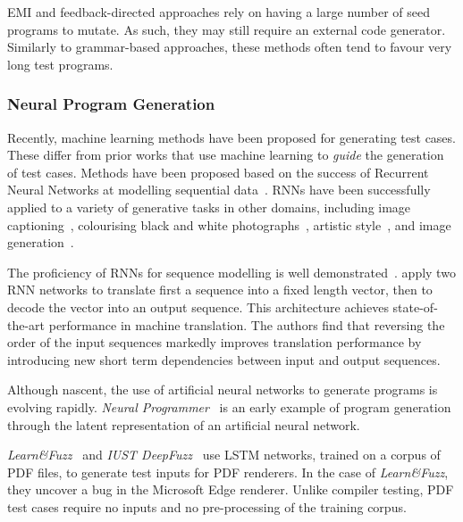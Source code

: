 EMI and feedback-directed approaches rely on having a large number of seed programs to mutate. As such, they may still require an external code generator. Similarly to grammar-based approaches, these methods often tend to favour very long test programs.


\subsubsection{Neural Program Generation}
\label{subsec:related-work-neural-program-generation}

Recently, machine learning methods have been proposed for generating test cases. These differ from prior works that use machine learning to \emph{guide} the generation of test cases.
Methods have been proposed based on the success of Recurrent Neural Networks at modelling sequential data~\cite{Jozefowicz2016a}. RNNs have been successfully applied to a variety of generative tasks in other domains, including image captioning~\cite{Vinyals}, colourising black and white photographs~\cite{Zhang2016}, artistic style~\cite{Gatys2015}, and image generation~\cite{Gregor2014}.

The proficiency of RNNs for sequence modelling is well demonstrated~\cite{Sutskever2014}. \citeauthor{Sutskever2014} apply two RNN networks to translate first a sequence into a fixed length vector, then to decode the vector into an output sequence. This architecture achieves state-of-the-art performance in machine translation. The authors find that reversing the order of the input sequences markedly improves translation performance by introducing new short term dependencies between input and output sequences.

Although nascent, the use of artificial neural networks to generate programs is evolving rapidly. \emph{Neural Programmer}~\cite{Neelakantan2016} is an early example of program generation through the latent representation of an artificial neural network.

%
\emph{Learn\&Fuzz}~\cite{Godefroid2017} and \emph{IUST DeepFuzz}~\cite{Nasrabadi2018} use LSTM networks, trained on a corpus of PDF files, to generate test inputs for PDF renderers. In the case of \emph{Learn\&Fuzz}, they uncover a bug in the Microsoft Edge renderer. Unlike compiler testing, PDF test cases require no inputs and no pre-processing of the training corpus.

